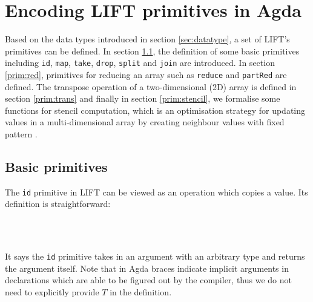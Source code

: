 \documentclass{l4proj}
\begin{document}
\section{Encoding LIFT primitives in Agda}
\label{sec:primitive}
Based on the data types introduced in section \ref{sec:datatype}, a set of LIFT's primitives can be defined. In section \ref{prim:basic}, the definition of some basic primitives including \texttt{id}, \texttt{map}, \texttt{take}, \texttt{drop}, \texttt{split} and \texttt{join} are introduced. In section \ref{prim:red}, primitives for reducing an array such as \texttt{reduce} and \texttt{partRed} are defined. The transpose operation of a two-dimensional (2D) array is defined in section \ref{prim:trans} and finally in section \ref{prim:stencil}, we formalise some functions for stencil computation, which is an optimisation strategy for updating values in a multi-dimensional array by creating neighbour values with fixed pattern \citep{hagedorn2018high}.
\subsection{Basic primitives}
\label{prim:basic}
The \texttt{id} primitive in LIFT can be viewed as an operation which copies a value.  Its definition is straightforward:
\begin{code}%
\>[0]\<%
\\
\>[0]\AgdaSpace{}%
\AgdaSymbol{:}\AgdaSpace{}%
\AgdaSymbol{\{}\AgdaSpace{}%
\AgdaSymbol{:}\AgdaSpace{}%
\AgdaSymbol{\}}\AgdaSpace{}%
\AgdaSpace{}%
\AgdaSpace{}%
\AgdaSpace{}%
\<%
\\
\>[0]\AgdaSpace{}%
\AgdaSpace{}%
\AgdaSymbol{=}\AgdaSpace{}%
\<%
\end{code}
It says the \texttt{id} primitive takes in an argument with an arbitrary type and returns the argument itself. Note that in Agda braces indicate implicit arguments in declarations which are able to be figured out by the compiler, thus we do not need to explicitly provide $T$ in the definition.
\end{document}
